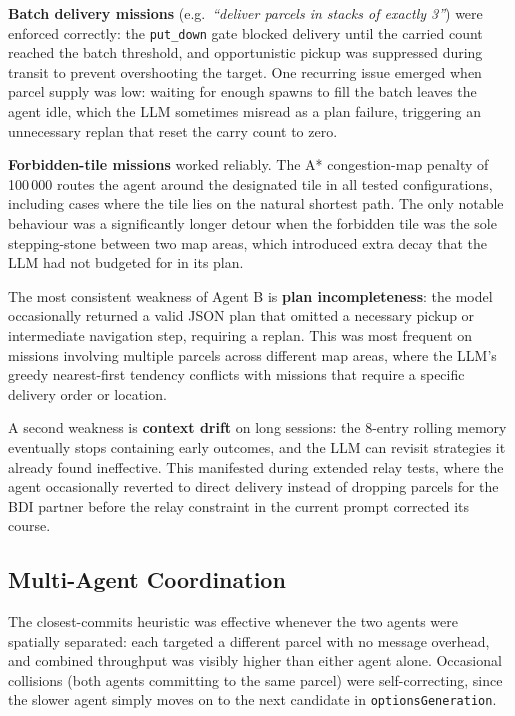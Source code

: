 \documentclass[10pt,a4paper,twocolumn]{article}
\begin{document}
\textbf{Batch delivery missions} (e.g.\ \emph{``deliver parcels in
stacks of exactly 3''}) were enforced correctly: the \texttt{put\_down}
gate blocked delivery until the carried count reached the batch
threshold, and opportunistic pickup was suppressed during transit to
prevent overshooting the target.  One recurring issue emerged when parcel
supply was low: waiting for enough spawns to fill the batch leaves the
agent idle, which the LLM sometimes misread as a plan failure,
triggering an unnecessary replan that reset the carry count to zero.

\textbf{Forbidden-tile missions} worked reliably.  The A* congestion-map
penalty of 100\,000 routes the agent around the designated tile in all
tested configurations, including cases where the tile lies on the natural
shortest path.  The only notable behaviour was a significantly longer
detour when the forbidden tile was the sole stepping-stone between two
map areas, which introduced extra decay that the LLM had not budgeted for
in its plan.

The most consistent weakness of Agent B is \textbf{plan incompleteness}:
the model occasionally returned a valid JSON plan that omitted a necessary
pickup or intermediate navigation step, requiring a replan.  This was most
frequent on missions involving multiple parcels across different map areas,
where the LLM's greedy nearest-first tendency conflicts with missions that
require a specific delivery order or location.

A second weakness is \textbf{context drift} on long sessions: the 8-entry
rolling memory eventually stops containing early outcomes, and the LLM can
revisit strategies it already found ineffective.  This manifested during
extended relay tests, where the agent occasionally reverted to direct
delivery instead of dropping parcels for the BDI partner before the relay
constraint in the current prompt corrected its course.

\subsection{Multi-Agent Coordination}

The closest-commits heuristic was effective whenever the two agents were
spatially separated: each targeted a different parcel with no message
overhead, and combined throughput was visibly higher than either agent
alone.  Occasional collisions (both agents committing to the same
parcel) were self-correcting, since the slower agent simply moves on to
the next candidate in \texttt{optionsGeneration}.
\end{document}
